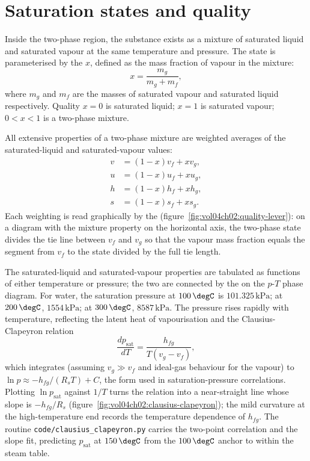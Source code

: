\section{Saturation states and quality}

Inside the two-phase region, the substance exists as a mixture of
saturated liquid and saturated vapour at the same temperature and
pressure. The state is parameterised by the  $x$,
defined as the mass fraction of vapour in the mixture:
\[
x = \frac{m_g}{m_g + m_f},
\]
where $m_g$ and $m_f$ are the masses of saturated vapour and
saturated liquid respectively. Quality $x = 0$ is saturated liquid;
$x = 1$ is saturated vapour; $0 < x < 1$ is a two-phase mixture.

All extensive properties of a two-phase mixture are weighted averages
of the saturated-liquid and saturated-vapour values:
\begin{align*}
v &= (1 - x) v_f + x v_g, \\
u &= (1 - x) u_f + x u_g, \\
h &= (1 - x) h_f + x h_g, \\
s &= (1 - x) s_f + x s_g.
\end{align*}
Each weighting is read graphically by the 
(figure~\ref{fig:vol04ch02:quality-lever}): on a diagram with the
mixture property on the horizontal axis, the two-phase state divides the
tie line between $v_f$ and $v_g$ so that the vapour mass fraction equals
the segment from $v_f$ to the state divided by the full tie length.


The saturated-liquid and saturated-vapour properties are tabulated as
functions of either temperature or pressure; the two are connected by
the  on the $p$-$T$ phase diagram. For
water, the saturation pressure at $100\,\degC$ is $101.325\,\text{kPa}$;
at $200\,\degC$, $1554\,\text{kPa}$; at $300\,\degC$, $8587\,\text{kPa}$.
The pressure rises rapidly with temperature, reflecting the latent
heat of vapourisation and the Clausius-Clapeyron relation
\[
\frac{dp_{\text{sat}}}{dT} = \frac{h_{fg}}{T(v_g - v_f)},
\]
which integrates (assuming $v_g \gg v_f$ and ideal-gas behaviour for
the vapour) to $\ln p \approx -h_{fg}/(R_s T) + C$, the form used in
saturation-pressure correlations. Plotting $\ln p_{\text{sat}}$ against
$1/T$ turns the relation into a near-straight line whose slope is
$-h_{fg}/R_s$ (figure~\ref{fig:vol04ch02:clausius-clapeyron}); the mild
curvature at the high-temperature end records the temperature dependence
of $h_{fg}$. The routine \texttt{code/clausius\_clapeyron.py} carries the
two-point correlation and the slope fit, predicting $p_{\text{sat}}$ at
$150\,\degC$ from the $100\,\degC$ anchor to within the steam table.

